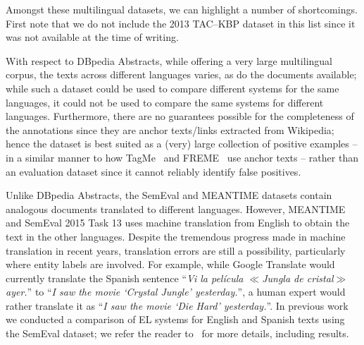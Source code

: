\documentclass{llncs}
\begin{document}
Amongst these multilingual datasets, we can highlight a number of shortcomings. First note that we do not include the 2013 TAC--KBP dataset in this list since it was not available at the time of writing. 

With respect to DBpedia Abstracts, while offering a very large multilingual corpus, the texts across different languages varies, as do the documents available; while such a dataset could be used to compare different systems for the same languages, it could not be used to compare the same systems for different languages. Furthermore, there are no guarantees possible for the completeness of the annotations since they are anchor texts/links extracted from Wikipedia; hence the dataset is best suited as a (very) large collection of positive examples -- in a similar manner to how TagMe~\cite{ferragina2010tagme} and FREME~\cite{freme-ner2016} use anchor texts -- rather than an evaluation dataset since it cannot reliably identify false positives.

Unlike DBpedia Abstracts, the SemEval and MEANTIME datasets contain analogous documents translated to different languages. However, MEANTIME and SemEval 2015 Task 13 uses machine translation from English to obtain the text in the other languages. Despite the tremendous progress made in machine translation in recent years, translation errors are still a possibility, particularly where entity labels are involved. For example, while Google Translate would currently translate the Spanish sentence ``\textit{Vi la película {\scriptsize$\ll$}Jungla de cristal{\scriptsize$\gg$ }ayer.}'' to ``\textit{I saw the movie `Crystal Jungle' yesterday.}'', a human expert would rather translate it as ``\textit{I saw the movie `Die Hard' yesterday.}''. In previous work we conducted a comparison of EL systems for English and Spanish texts using the SemEval dataset; we refer the reader to~\cite{Rosales-MendezP17} for more details, including results.

\end{document}
